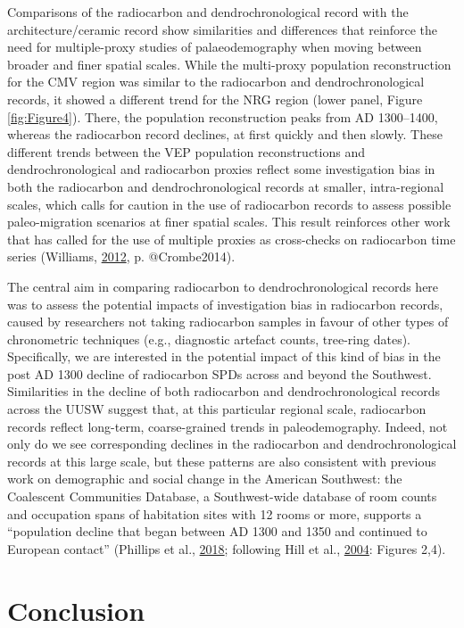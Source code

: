\documentclass[
]{article}
\begin{document}
Comparisons of the radiocarbon and dendrochronological record with the architecture/ceramic record show similarities and differences that reinforce the need for multiple-proxy studies of palaeodemography when moving between broader and finer spatial scales. While the multi-proxy population reconstruction for the CMV region was similar to the radiocarbon and dendrochronological records, it showed a different trend for the NRG region (lower panel, Figure \ref{fig:Figure4}). There, the population reconstruction peaks from AD 1300--1400, whereas the radiocarbon record declines, at first quickly and then slowly. These different trends between the VEP population reconstructions and dendrochronological and radiocarbon proxies reflect some investigation bias in both the radiocarbon and dendrochronological records at smaller, intra-regional scales, which calls for caution in the use of radiocarbon records to assess possible paleo-migration scenarios at finer spatial scales. This result reinforces other work that has called for the use of multiple proxies as cross-checks on radiocarbon time series (Williams, \protect\hyperlink{ref-Williams2012}{2012}, p. @Crombe2014).

The central aim in comparing radiocarbon to dendrochronological records here was to assess the potential impacts of investigation bias in radiocarbon records, caused by researchers not taking radiocarbon samples in favour of other types of chronometric techniques (e.g., diagnostic artefact counts, tree-ring dates). Specifically, we are interested in the potential impact of this kind of bias in the post AD 1300 decline of radiocarbon SPDs across and beyond the Southwest. Similarities in the decline of both radiocarbon and dendrochronological records across the UUSW suggest that, at this particular regional scale, radiocarbon records reflect long-term, coarse-grained trends in paleodemography. Indeed, not only do we see corresponding declines in the radiocarbon and dendrochronological records at this large scale, but these patterns are also consistent with previous work on demographic and social change in the American Southwest: the Coalescent Communities Database, a Southwest-wide database of room counts and occupation spans of habitation sites with 12 rooms or more, supports a ``population decline that began between AD 1300 and 1350 and continued to European contact'' (Phillips et al., \protect\hyperlink{ref-Phillips2018}{2018}; following Hill et al., \protect\hyperlink{ref-Hill2004}{2004}: Figures 2,4).

\hypertarget{conclusion}{%
\section*{Conclusion}\label{conclusion}}
\end{document}

